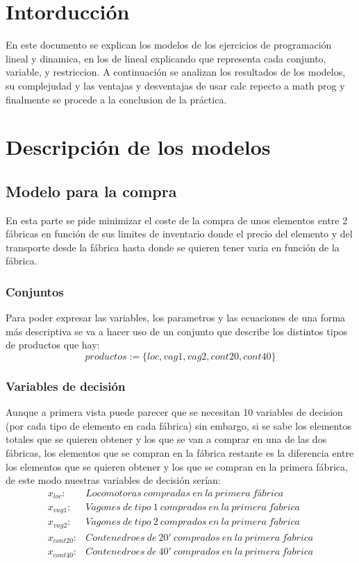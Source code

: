 \documentclass[11pt,spanish]{article}
\begin{document}


	\section{Intorducción}
	En este documento se explican los modelos de los ejercicios de programación lineal y dinamica, en los de lineal explicando que representa cada conjunto, variable, y restriccion. A continuación se analizan los resultados de los modelos, su complejudad y las ventajas y desventajas de usar calc repecto a math prog y finalmente se procede a la conclusion de la práctica.

	\section{Descripción de los modelos}
		\subsection{Modelo para la compra}
			En esta parte se pide minimizar el coste de la compra de unos elementos entre 2 fábricas en función de sus limites de inventario donde el precio del elemento y del transporte desde la fábrica hasta donde se quieren tener varia en función de la fábrica.
			\subsubsection{Conjuntos}
			Para poder expresar las variables, los parametros y las ecuaciones de una forma más descriptiva se va a hacer uso de un conjunto que describe los distintos tipos de productos que hay:
			$$ productos := \{loc, vag1, vag2, cont20, cont40\} $$
			\subsubsection{Variables de decisión}
			Aunque a primera vista puede parecer que se necesitan 10 variables de decision (por cada tipo de elemento en cada fábrica) sin embargo, si se sabe los elementos totales que se quieren obtener y los que se van a comprar en una de las dos fábricas, los elementos que se compran en la fábrica restante es la diferencia entre los elementos que se quieren obtener y los que se compran en la primera fábrica, de este modo nuestras variables de decisión serían:
			\begin{align*}
			x_{loc}:& Locomotoras\ compradas\ en\ la\ primera\ fábrica \\
			x_{vag1}:& Vagones\ de\ tipo\ 1\ comprados\ en\ la\ primera\ f\acute{a}brica \\
			x_{vag2}:& Vagones\ de\ tipo\ 2\ comprados\ en\ la\ primera\ f\acute{a}brica \\
			x_{cont20}:& Contenedroes\ de\ 20'\ comprados\ en\ la\ primera\ f\acute{a}brica \\
			x_{cont40}:& Contenedroes\ de\ 40'\ comprados\ en\ la\ primera\ f\acute{a}brica 
			\end{align*}
			
\end{document}
